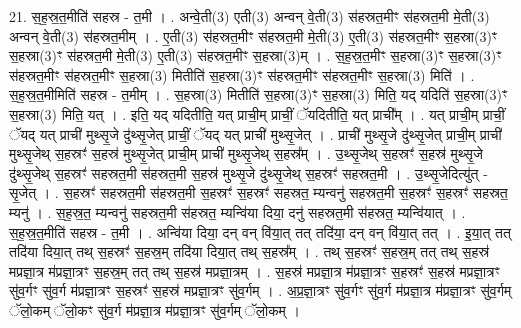 \documentclass[17pt]{extarticle}
\begin{document}
21. स॒ह॒स्र॒त॒मीति॑ सहस्र - त॒मी । . अन्वे॒ती(3) एती(3) अन्वन् वे॒ती(3) स॑हस्रत॒मीꣳ स॑हस्रत॒मी मे॒ती(3) अन्वन् वे॒ती(3) स॑हस्रत॒मीम् । . ए॒ती(3) स॑हस्रत॒मीꣳ स॑हस्रत॒मी मे॒ती(3) ए॒ती(3) स॑हस्रत॒मीꣳ स॒हस्रा(3)ꣳ स॒हस्रा(3)ꣳ स॑हस्रत॒मी मे॒ती(3) ए॒ती(3) स॑हस्रत॒मीꣳ स॒हस्रा(3)म् । . स॒ह॒स्र॒त॒मीꣳ स॒हस्रा(3)ꣳ स॒हस्रा(3)ꣳ स॑हस्रत॒मीꣳ स॑हस्रत॒मीꣳ स॒हस्रा(3) मितीति॑ स॒हस्रा(3)ꣳ स॑हस्रत॒मीꣳ स॑हस्रत॒मीꣳ स॒हस्रा(3) मिति॑ । . स॒ह॒स्र॒त॒मीमिति॑ सहस्र - त॒मीम् । . स॒हस्रा(3) मितीति॑ स॒हस्रा(3)ꣳ स॒हस्रा(3) मिति॒ यद् यदिति॑ स॒हस्रा(3)ꣳ स॒हस्रा(3) मिति॒ यत् । . इति॒ यद् यदितीति॒ यत् प्राची॒म् प्राचीं॒ ॅयदितीति॒ यत् प्राची᳚म् । . यत् प्राची॒म् प्राचीं॒ ॅयद् यत् प्राची॑ मुथ्सृ॒जे दु॑थ्सृ॒जेत् प्राचीं॒ ॅयद् यत् प्राची॑ मुथ्सृ॒जेत् । . प्राची॑ मुथ्सृ॒जे दु॑थ्सृ॒जेत् प्राची॒म् प्राची॑ मुथ्सृ॒जेथ् स॒हस्रꣳ॑ स॒हस्र॑ मुथ्सृ॒जेत् प्राची॒म् प्राची॑ मुथ्सृ॒जेथ् स॒हस्र᳚म् । . उ॒थ्सृ॒जेथ् स॒हस्रꣳ॑ स॒हस्र॑ मुथ्सृ॒जे दु॑थ्सृ॒जेथ् स॒हस्रꣳ॑ सहस्रत॒मी स॑हस्रत॒मी स॒हस्र॑ मुथ्सृ॒जे दु॑थ्सृ॒जेथ् स॒हस्रꣳ॑ सहस्रत॒मी । . उ॒थ्सृ॒जेदित्यु॑त् - सृ॒जेत् । . स॒हस्रꣳ॑ सहस्रत॒मी स॑हस्रत॒मी स॒हस्रꣳ॑ स॒हस्रꣳ॑ सहस्रत॒ म्यन्वनु॑ सहस्रत॒मी स॒हस्रꣳ॑ स॒हस्रꣳ॑ सहस्रत॒ म्यनु॑ । . स॒ह॒स्र॒त॒ म्यन्वनु॑ सहस्रत॒मी स॑हस्रत॒ म्यन्वि॑या दिया॒ दनु॑ सहस्रत॒मी स॑हस्रत॒ म्यन्वि॑यात् । . स॒ह॒स्र॒त॒मीति॑ सहस्र - त॒मी । . अन्वि॑या दिया॒ दन् वन् वि॑या॒त् तत् तदि॑या॒ दन् वन् वि॑या॒त् तत् । . इ॒या॒त् तत् तदि॑या दिया॒त् तथ् स॒हस्रꣳ॑ स॒हस्र॒म् तदि॑या दिया॒त् तथ् स॒हस्र᳚म् । . तथ् स॒हस्रꣳ॑ स॒हस्र॒म् तत् तथ् स॒हस्र॑ मप्रज्ञा॒त्र म॑प्रज्ञा॒त्रꣳ स॒हस्र॒म् तत् तथ् स॒हस्र॑ मप्रज्ञा॒त्रम् । . स॒हस्र॑ मप्रज्ञा॒त्र म॑प्रज्ञा॒त्रꣳ स॒हस्रꣳ॑ स॒हस्र॑ मप्रज्ञा॒त्रꣳ सु॑व॒र्गꣳ सु॑व॒र्ग म॑प्रज्ञा॒त्रꣳ स॒हस्रꣳ॑ स॒हस्र॑ मप्रज्ञा॒त्रꣳ सु॑व॒र्गम् । . अ॒प्र॒ज्ञा॒त्रꣳ सु॑व॒र्गꣳ सु॑व॒र्ग म॑प्रज्ञा॒त्र म॑प्रज्ञा॒त्रꣳ सु॑व॒र्गम् ॅलो॒कम् ॅलो॒कꣳ सु॑व॒र्ग म॑प्रज्ञा॒त्र म॑प्रज्ञा॒त्रꣳ सु॑व॒र्गम् ॅलो॒कम् । \newline
\end{document}
